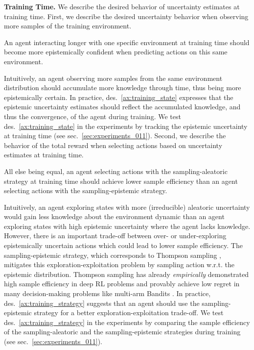 \textbf{Training Time.} We describe the desired behavior of uncertainty estimates at training time. First, we describe the desired uncertainty behavior when observing more samples of the training environment.
\begin{desiderata}
    \label{ax:training_state}
    An agent interacting longer with one specific environment at training time should become more epistemically confident when predicting actions on this same environment.
\end{desiderata}
\vspace{-2mm}
Intuitively, an agent observing more samples from the same environment distribution should accumulate more knowledge through time, thus being more epistemically certain. In practice, des.~\ref{ax:training_state} expresses that the epistemic uncertainty estimates should reflect the accumulated knowledge, and thus the convergence, of the agent during training. We test des.~\ref{ax:training_state} in the experiments by tracking the epistemic uncertainty at training time (see sec.~\ref{sec:experiments_011}). Second, we describe the behavior of the total reward when selecting actions based on uncertainty estimates at training time.
\begin{desiderata}
    \label{ax:training_strategy}
    All else being equal, an agent selecting actions with the sampling-aleatoric strategy at training time should achieve lower sample efficiency than an agent selecting actions with the sampling-epistemic strategy.
\end{desiderata}
Intuitively, an agent exploring states with more (irreducible) aleatoric uncertainty would gain less knowledge about the environment dynamic than an agent exploring states with high epistemic uncertainty where the agent lacks knowledge. However, there is an important trade-off between over- or under-exploring epistemically uncertain actions which could lead to lower sample efficiency. The sampling-epistemic strategy, which corresponds to Thompson sampling \citep{thompson-sampling}, mitigates this exploration-exploitation problem by sampling action w.r.t. the epistemic distribution. Thompson sampling has already \emph{empirically} demonstrated high sample efficiency in deep RL problems \citep{dropout} and provably achieve low regret in many decision-making problems like multi-arm Bandits \citep{thompson-sampling-mab, thompson-sampling-information}. In practice, des.~\ref{ax:training_strategy} suggests that an agent should use the sampling-epistemic strategy for a better exploration-exploitation trade-off. We test des.~\ref{ax:training_strategy} in the experiments by comparing the sample efficiency of the sampling-aleatoric and the sampling-epistemic strategies during training (see sec.~\ref{sec:experiments_011}).

